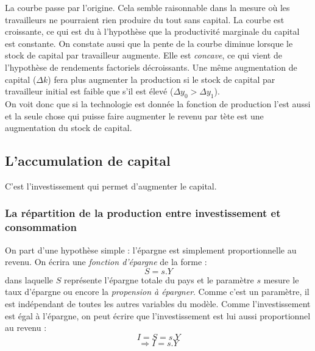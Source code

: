 \documentclass[10pt]{book}
\begin{document}
La courbe passe par l'origine. Cela semble raisonnable dans la mesure où les travailleurs ne pourraient rien produire du tout sans capital. La courbe est croissante, ce qui est du à l'hypothèse que la productivité marginale du capital est constante. On constate aussi que la pente de la courbe diminue lorsque le stock de capital par travailleur augmente. Elle est \textit{concave}, ce qui vient de l'hypothèse de rendements factoriels décroissants. Une même augmentation de capital ($\Delta k$) fera plus augmenter la production si le stock de capital par travailleur initial est faible que s'il est élevé ($\Delta y_0 > \Delta y_1$). \\
On voit donc que si la technologie est donnée la fonction de production l'est aussi et la seule chose qui puisse faire augmenter le revenu par tète est une augmentation du stock de capital.
\subsection{L'accumulation de capital}
C'est l'investissement qui permet d'augmenter le capital.
\subsubsection{La répartition de la production entre investissement et consommation}
On part d'une hypothèse simple : l'épargne est simplement proportionnelle au revenu. On écrira une \textit{fonction d'épargne} de la forme :
$$ S = s.Y$$
dans laquelle $S$ représente l'épargne totale du pays et le paramètre $s$ mesure le taux d'épargne ou encore la \textit{propension à épargner}. Comme c'est un paramètre, il est indépendant de toutes les autres variables du modèle. Comme l'investissement est égal à l'épargne, on peut écrire que l'investissement est lui aussi proportionnel au revenu :
$$ I = S = s.Y $$
$$ \Rightarrow I = s.Y $$
\end{document}
